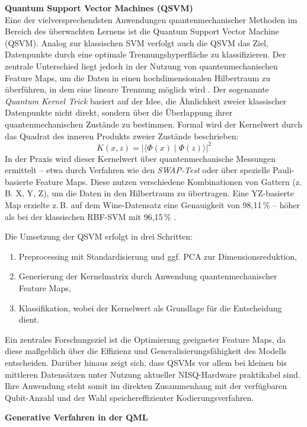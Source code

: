\vspace{0.3cm}
\noindent
\textbf{Quantum Support Vector Machines (QSVM)}\\
Eine der vielversprechendsten Anwendungen quantenmechanischer Methoden im Bereich des überwachten Lernens ist die Quantum Support Vector Machine (QSVM). Analog zur klassischen SVM verfolgt auch die QSVM das Ziel, Datenpunkte durch eine optimale Trennungshyperfläche zu klassifizieren. Der zentrale Unterschied liegt jedoch in der Nutzung von quantenmechanischen Feature Maps, um die Daten in einen hochdimensionalen Hilbertraum zu überführen, in dem eine lineare Trennung möglich wird \cite{kavitha2024}. Der sogenannte \textit{Quantum Kernel Trick} basiert auf der Idee, die Ähnlichkeit zweier klassischer Datenpunkte nicht direkt, sondern über die Überlappung ihrer quantenmechanischen Zustände zu bestimmen. Formal wird der Kernelwert durch das Quadrat des inneren Produkts zweier Zustände beschrieben:
\[
K(x, z) = \left| \langle \Phi(x) \mid \Phi(z) \rangle \right|^2
\]
In der Praxis wird dieser Kernelwert über quantenmechanische Messungen ermittelt – etwa durch Verfahren wie den \textit{SWAP-Test} oder über spezielle Pauli-basierte Feature Maps. Diese nutzen verschiedene Kombinationen von Gattern (z.\,B. X, Y, Z), um die Daten in den Hilbertraum zu übertragen. Eine YZ-basierte Map erzielte z.\,B. auf dem Wine-Datensatz eine Genauigkeit von 98{,}11\,\% – höher als bei der klassischen RBF-SVM mit 96{,}15\,\% \cite{kavitha2024}.  

Die Umsetzung der QSVM erfolgt in drei Schritten:  
\begin{enumerate}
  \item Preprocessing mit Standardisierung und ggf. PCA zur Dimensionsreduktion,
  \item Generierung der Kernelmatrix durch Anwendung quantenmechanischer Feature Maps,
  \item Klassifikation, wobei der Kernelwert als Grundlage für die Entscheidung dient.
\end{enumerate}  
Ein zentrales Forschungsziel ist die Optimierung geeigneter Feature Maps, da diese maßgeblich über die Effizienz und Generalisierungsfähigkeit des Modells entscheiden. Darüber hinaus zeigt sich, dass QSVMs vor allem bei kleinen bis mittleren Datensätzen unter Nutzung aktueller NISQ-Hardware praktikabel sind. Ihre Anwendung steht somit im direkten Zusammenhang mit der verfügbaren Qubit-Anzahl und der Wahl speichereffizienter Kodierungsverfahren.  

\vspace{0.3cm}
\noindent
\textbf{Generative Verfahren in der QML}  

